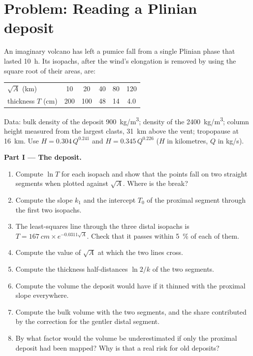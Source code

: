 \section{Problem: Reading a Plinian deposit}

\begin{problem}
\label{pb:b2:eruptive-styles:1}
An imaginary volcano has left a pumice fall from a single Plinian phase that
lasted \qty{10}{\hour}. Its isopachs, after the wind's elongation is removed by
using the square root of their areas, are:
\begin{center}
\small
\begin{tabular}{lccccc}
\hline
$\sqrt A$ (\unit{km}) & 10 & 20 & 40 & 80 & 120 \\
thickness $T$ (\unit{cm}) & 200 & 100 & 48 & 14 & 4.0 \\
\hline
\end{tabular}
\end{center}
Data: bulk density of the deposit \qty{900}{kg/m^3}; density of the 
\qty{2400}{kg/m^3}; column height measured from the largest clasts,
\qty{31}{km} above the vent; tropopause at \qty{16}{km}. Use $H =
0.304\,Q^{0.241}$ and $H = 0.345\,Q^{0.226}$ ($H$ in kilometres, $Q$ in
\unit{kg/s}).

\medskip\noindent\textbf{Part I --- The deposit.}
\begin{enumerate}
\item Compute $\ln T$ for each isopach and show that the points fall on two
straight segments when plotted against $\sqrt A$. Where is the break?
\item Compute the slope $k_1$ and the intercept $T_0$ of the proximal segment
through the first two isopachs.
\item The least-squares line through the three distal isopachs is $T =
\qty{167}{cm}\times e^{-0.0311\sqrt A}$. Check that it passes within
\qty{5}{\percent} of each of them.
\item Compute the value of $\sqrt A$ at which the two lines cross.
\item Compute the thickness half-distances $\ln 2/k$ of the two segments.
\item Compute the volume the deposit would have if it thinned with the proximal
slope everywhere.
\item Compute the bulk volume with the two segments, and the share contributed by
the correction for the gentler distal segment.
\item By what factor would the volume be underestimated if only the proximal
deposit had been mapped? Why is that a real risk for old deposits?
\end{enumerate}


\end{problem}
